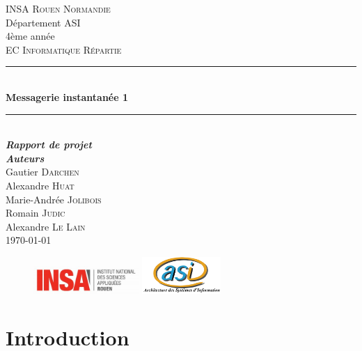 \documentclass[11pt,dvipsnames,svgnames]{report}
\begin{document}
\begin{titlepage}
\newcommand{\HRule}{\rule{\linewidth}{0.5mm}}
\center
{}\textsc{\huge INSA Rouen Normandie}\\[0.7cm]
\LARGE Département ASI~\\[0.5cm]
\Large{4ème année} ~\\[1.5cm]
\textsc{\Large EC Informatique Répartie}\\[0.5cm]

\HRule \\[0.4cm]
{ \huge \bfseries Messagerie instantanée 1}\\[0.18cm] \HRule \\[1.5cm]

\LARGE \emph{\textbf{Rapport de projet}} \\[1.3cm]

\large
	\emph{\textbf{Auteurs}}\\
	Gautier \textsc{Darchen} \\
	Alexandre \textsc{Huat} \\
	Marie-Andrée \textsc{Jolibois} \\
	Romain \textsc{Judic} \\
	Alexandre \textsc{Le Lain}\\[0.3cm]

\vfill{\today}

\begin{figure}
\includegraphics[width=4cm]{images/LogoINSA.png}\hfill
\includegraphics[width=3cm]{images/logoasi.png}
\end{figure}


 \end{titlepage}

\newpage
\tableofcontents

\newpage


\chapter{Introduction}
\end{document}
